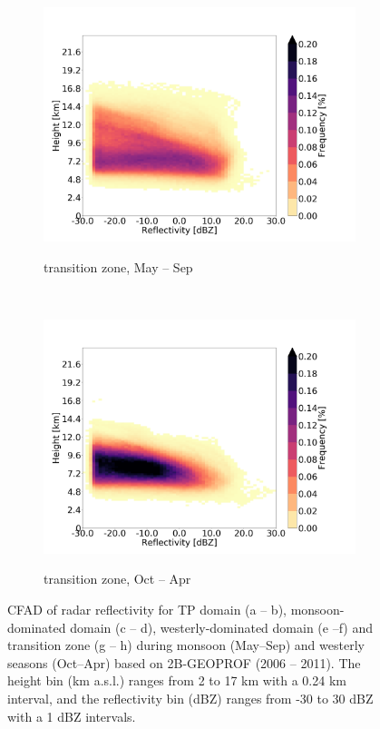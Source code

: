 \documentclass[alpha-refs]{wiley-article}
\begin{document}
\begin{figure}\ContinuedFloat
    \begin{subfigure}[t]{0.5\textwidth}
        \centering
        \caption{transition zone, May -- Sep }        
        \includegraphics[width=\textwidth]{radar_reflect_transitionzone_monsoonseason.png}
\label{fig:CFAD7}
    \end{subfigure}%
    ~ 
    \begin{subfigure}[t]{0.5\textwidth}
        \centering
        \caption{transition zone, Oct -- Apr}        
        \includegraphics[width=\textwidth]{radar_reflect_transitionzone_westerlyseason.png}
        \label{fig:CFAD8}
        \end{subfigure}
    \caption[]{CFAD of radar reflectivity for TP domain (a -- b), monsoon-dominated domain (c -- d), westerly-dominated domain (e --f) and transition zone (g -- h) during monsoon (May--Sep) and westerly seasons (Oct--Apr) based on 2B-GEOPROF (2006 -- 2011). The height bin (km a.s.l.) ranges from 2 to 17 km with a 0.24 km interval, and the reflectivity bin (dBZ) ranges from -30 to 30 dBZ with a 1 dBZ intervals.}
    \label{fig:CFAD}
\end{figure}
\end{document}
